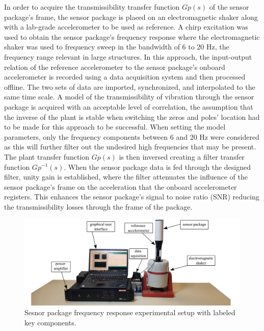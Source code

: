\documentclass[]{spie}  %
\begin{document}
	In order to acquire the transmissibility transfer function $Gp(s)$ of the sensor package’s frame, the sensor package is placed on an electromagnetic shaker along with a lab-grade accelerometer to be used as reference. A chirp excitation was used to obtain the sensor package’s frequency response where the electromagnetic shaker was used to frequency sweep in the bandwidth of 6 to 20 Hz, the frequency range relevant in large structures. In this approach, the input-output relation of the reference accelerometer to the sensor package’s onboard accelerometer is recorded using a data acquisition system and then processed offline. The two sets of data are imported, synchronized, and interpolated to the same time scale. A model of the transmissibility of vibration through the sensor package is acquired with an acceptable level of correlation, the assumption that the inverse of the plant is stable when switching the zeros and poles’ location had to be made for this approach to be successful. When setting the model parameters, only the frequency components between 6 and 20 Hz were considered as this will further filter out the undesired high frequencies that may be present. The plant transfer function $Gp(s)$ is then inversed creating a filter transfer function $Gp^{-1}(s)$. When the sensor package data is fed through the designed filter, unity gain is established, where the filter attenuates the influence of the sensor package’s frame on the acceleration that the onboard accelerometer registers. This enhances the sensor package’s signal to noise ratio (SNR) reducing the transmissibility losses through the frame of the package. 
	
	\begin{figure} [H]
		\centering
		\includegraphics[width=6 in]{figures/benchtop_experimental_setup}
		\caption{Sesnor package frequency response experimental setup with labeled key components.} 
		\label{fig:bench top experimental setup}
		
	\end{figure} 
\end{document}
